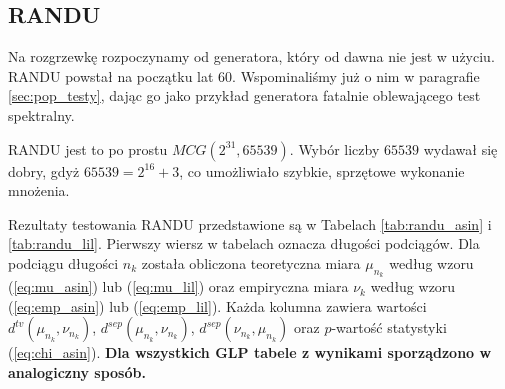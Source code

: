 \documentclass[a4paper,11pt,twoside]{book}
\newcommand{\Slil}[1]{S^{lil}_#1}
\newcommand{\Sasin}[1]{S^{asin}_#1}
\theoremstyle{definition}
\begin{document}
% 
%  
%  

\subsection{RANDU}
Na rozgrzewkę rozpoczynamy od generatora, który od dawna nie jest w użyciu. RANDU powstał na początku lat 60. Wspominaliśmy już o nim w paragrafie \ref{sec:pop_testy}, dając go jako przykład generatora fatalnie oblewającego test spektralny.

RANDU jest to po prostu $MCG(2^{31}, 65539)$. Wybór liczby $65539$ wydawał się dobry, gdyż $65539 = 2^{16} + 3$, co umożliwiało szybkie, sprzętowe wykonanie mnożenia.

Rezultaty testowania RANDU przedstawione są w Tabelach \ref{tab:randu_asin} i \ref{tab:randu_lil}. Pierwszy wiersz w tabelach oznacza długości podciągów. Dla podciągu długości $n_k$ została obliczona teoretyczna miara $\mu_{n_k}$ według wzoru (\ref{eq:mu_asin}) lub (\ref{eq:mu_lil}) oraz empiryczna miara $\nu_k$ według wzoru (\ref{eq:emp_asin}) lub (\ref{eq:emp_lil}). Każda kolumna zawiera wartości $d^{tv}(\mu_{n_k}, \nu_{n_k})$, $d^{sep}(\mu_{n_k}, \nu_{n_k})$, $d^{sep}(\nu_{n_k}, \mu_{n_k})$ oraz $p$-wartość statystyki (\ref{eq:chi_asin}). \textbf{Dla wszystkich GLP tabele z wynikami sporządzono w analogiczny sposób.}
\end{document}
